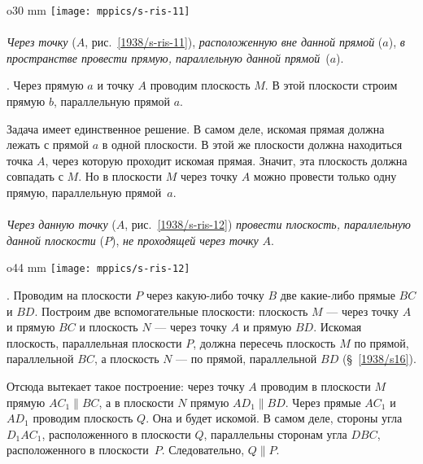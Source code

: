 \begin{wrapfigure}{o}{30 mm}
\centering
\vskip-8mm
\texttt{[image: mppics/s-ris-11]}
\caption{}\label{1938/s-ris-11}
\end{wrapfigure}

\paragraph{}\label{1938/s19}
\emph{Через точку} ($A$, рис.~\ref{1938/s-ris-11}), \emph{расположенную вне данной прямой} ($a$), \emph{в пространстве провести прямую, параллельную данной прямой}~($a$).


\medskip

\mbox{.}
Через прямую $a$ и точку $A$ проводим плоскость $M$.
В этой плоскости строим прямую $b$, параллельную прямой $a$.

Задача имеет единственное решение.
В самом деле, искомая прямая должна лежать с прямой $a$ в одной плоскости.
В этой же плоскости должна находиться точка $A$, через которую проходит искомая прямая.
Значит, эта плоскость должна совпадать с $M$.
Но в плоскости $M$ через точку $A$ можно провести только одну прямую, параллельную прямой~$a$.

\paragraph{}\label{1938/s20}
\emph{Через данную точку} ($A$, рис.~\ref{1938/s-ris-12}) \emph{провести плоскость, параллельную данной плоскости} ($P$), \emph{не проходящей через точку} $A$.

\begin{wrapfigure}{o}{44 mm}
\centering
\texttt{[image: mppics/s-ris-12]}
\caption{}\label{1938/s-ris-12}
\end{wrapfigure}

\mbox{.}
Проводим на плоскости $P$ через какую-либо точку $B$ две какие-либо прямые $BC$ и $BD$.
Построим две вспомогательные плоскости: плоскость $M$ — через точку $A$ и прямую $BC$ и плоскость $N$ — через точку $A$ и прямую $BD$.
Искомая плоскость, параллельная плоскости $P$, должна пересечь плоскость $M$ по прямой, параллельной $BC$, а плоскость $N$ — по прямой, параллельной $BD$ (§~\ref{1938/s16}).

Отсюда вытекает такое построение: через точку $A$ проводим в плоскости $M$ прямую $AC_1\parallel BC$, а в плоскости $N$ прямую $AD_1\parallel BD$.
Через прямые $AC_1$ и $AD_1$ проводим плоскость $Q$.
Она и будет искомой.
В самом деле, стороны угла $D_1AC_1$, расположенного в плоскости $Q$, параллельны сторонам угла $DBC$, расположенного в плоскости~$P$.
Следовательно, $Q\parallel P$.

